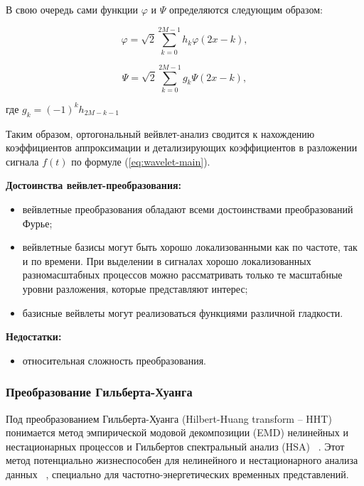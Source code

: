 \documentclass[utf8x, 14pt, oneside, a4paper]{article}
\begin{document}
	В свою очередь сами функции $\varphi$ и $\Psi$ определяются следующим образом:
	
	\begin{equation}
		\varphi = \sqrt{2}\sum_{k=0}^{2M-1}h_k\varphi(2x-k),
	\end{equation}

	\begin{equation}
		\Psi = \sqrt{2}\sum_{k=0}^{2M-1}g_k\Psi(2x-k),
	\end{equation}

	где $g_k = (-1)^kh_{2M-k-1}$
	
	Таким образом, ортогональный вейвлет-анализ сводится к нахождению коэффициентов аппроксимации и детализирующих коэффициентов в разложении сигнала $f(t)$ по формуле (\ref{eq:wavelet-main}).
	
	\begin{flushleft}
		{\bf Достоинства вейвлет-преобразования:}
	\end{flushleft}
	\begin{itemize}
		\item вейвлетные преобразования обладают всеми достоинствами
		преобразований Фурье;
		\item вейвлетные базисы могут быть хорошо локализованными как по
		частоте, так и по времени. При выделении в сигналах хорошо
		локализованных разномасштабных процессов можно рассматривать только те масштабные уровни разложения, которые представляют интерес;
		\item базисные вейвлеты могут реализоваться функциями различной
		гладкости.
	\end{itemize}

	\begin{flushleft}
		{\bf Недостатки:}
	\end{flushleft}
	\begin{itemize}
		\item относительная сложность преобразования.
	\end{itemize}
	
	\subsubsection{Преобразование Гильберта-Хуанга}
	
	Под преобразованием Гильберта-Хуанга (Hilbert-Huang transform – HHT) понимается метод эмпирической модовой декомпозиции (EMD) нелинейных и нестационарных процессов и Гильбертов спектральный анализ (HSA) ~\cite{magistr}. Этот метод потенциально жизнеспособен для нелинейного и нестационарного анализа данных ~\cite{hilbert_huang}, специально для частотно-энергетических временных представлений.
	
\end{document}
